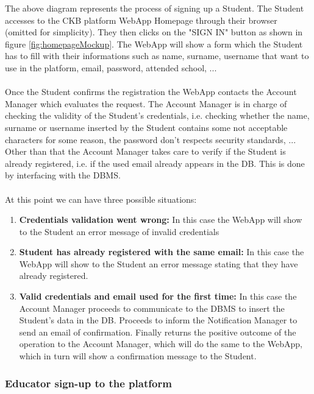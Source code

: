 \documentclass{article}
\begin{document}
{\begin{itemize}
        The above diagram represents the process of signing up a Student.
        The Student accesses to the CKB platform WebApp Homepage through their browser
        (omitted for simplicity). They then clicks on the "SIGN IN" button as
        shown in figure \ref{fig:homepageMockup}. The WebApp will show a form
        which the Student has to fill with their informations such as
        name, surname, username that want to use in the platform, email,
        password, attended school, ... 
        \\ \\
        Once the Student confirms the registration the WebApp contacts the
        Account Manager which evaluates the request.
        The Account Manager is in charge of checking the validity of the Student's credentials,
        i.e. checking whether the name, surname or username inserted by the Student
        contains some not acceptable characters for some reason, the password
        don't respects security standards, ... \\
        Other than that the Account Manager takes care to verify if the Student is already
        registered, i.e. if the used email already appears in the DB. This is done by interfacing
        with the DBMS.
        \\ \\
        At this point we can have three possible situations:
        \begin{enumerate}
            \item \textbf{Credentials validation went wrong:} In this case the WebApp will show to the
            Student an error message of invalid credentials
            \item \textbf{Student has already registered with the same email:} In this case the WebApp will show to the
            Student an error message stating that they have already registered.
            \item \textbf{Valid credentials and email used for the first time:} In this case the Account
            Manager proceeds to communicate to the DBMS to insert the Student's data in the DB.
            Proceeds to inform the Notification Manager to send an email of confirmation.
            Finally returns the positive outcome of the operation to the Account Manager,
            which will do the same to the WebApp, which in turn will show a confirmation message to the Student.
        \end{enumerate}
    \subsubsection{Educator sign-up to the platform}
        \begin{figure}[H]
            \centering
            \caption{}
            \label{fig:}
        \end{figure}

\end{itemize}}
\end{document}
